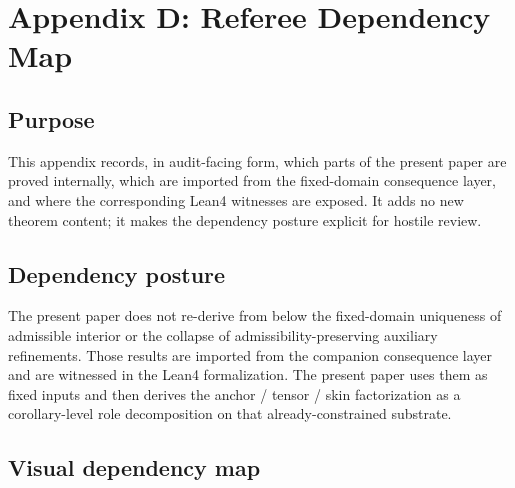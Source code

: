 \documentclass[12pt]{article}
\theoremstyle{plain}
\begin{document}
\section{Appendix D: Referee Dependency Map}

\subsection*{Purpose}
This appendix records, in audit-facing form, which parts of the present paper are proved internally, which are imported from the fixed-domain consequence layer, and where the corresponding Lean4 witnesses are exposed. It adds no new theorem content; it makes the dependency posture explicit for hostile review.

\subsection*{Dependency posture}
The present paper does not re-derive from below the fixed-domain uniqueness of admissible interior or the collapse of admissibility-preserving auxiliary refinements. Those results are imported from the companion consequence layer and are witnessed in the Lean4 formalization. The present paper uses them as fixed inputs and then derives the anchor / tensor / skin factorization as a corollary-level role decomposition on that already-constrained substrate.

\subsection*{Visual dependency map}
\end{document}
